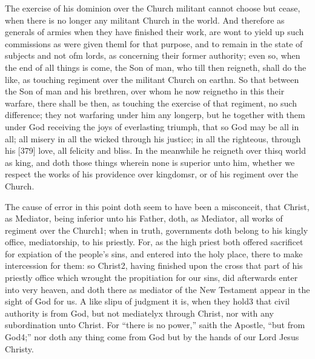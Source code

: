 The exercise of his dominion over the Church militant cannot choose but cease, when there is no longer any militant Church in the world. And therefore as generals of armies when they have finished their work, are wont to yield up such commissions as were given theml for that purpose, and to remain in the state of subjects and not ofm lords, as concerning their former authority; even so, when the end of all things is come, the Son of man, who till then reigneth, shall do the like, as touching regiment over the militant Church on earthn. So that between the Son of man and his brethren, over whom he now reignetho in this their warfare, there shall be then, as touching the exercise of that regiment, no such difference; they not warfaring under him any longerp, but he together with them under God receiving the joys of everlasting triumph, that so God may be all in all; all misery in all the wicked through his justice; in all the righteous, through his [379] love, all felicity and bliss. In the meanwhile he reigneth over thisq world as king, and doth those things wherein none is superior unto him, whether we respect the works of his providence over kingdomsr, or of his regiment over the Church.

The cause of error in this point doth seem to have been a misconceit, that Christ, as Mediator, being inferior unto his Father, doth, as Mediator, all works of regiment over the Church1; when in truth, governments doth belong to his kingly office, mediatorship, to his priestly. For, as the high priest both offered sacrificet for expiation of the people’s sins, and entered into the holy place, there to make intercession for them: so Christ2, having finished upon the cross that part of his priestly office which wrought the propitiation for our sins, did afterwards enter into very heaven, and doth there as mediator of the New Testament appear in the sight of God for us. A like slipu of judgment it is, when they hold3 that civil authority is from God, but not mediatelyx through Christ, nor with any subordination unto Christ. For “there is no power,” saith the Apostle, “but from God4;” nor doth any thing come from God but by the hands of our Lord Jesus Christy.

